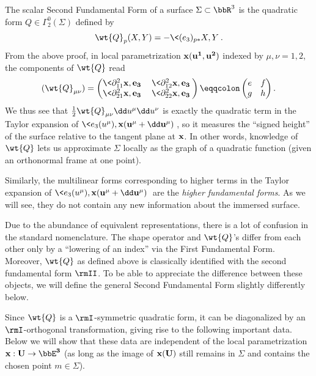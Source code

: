 \begin{defn}
    The scalar Second Fundamental Form of a surface $\Sigma\subset\bbR^3$ is the quadratic form $Q\in\Gamma^0_2(\Sigma)$ defined by 
    \[\wt{Q}_p(X,Y)=-\<(e_3)_{p\ast}X,Y\>.\]
    From the above proof, in local parametrization $\bf{x}(u^1,u^2)$ indexed by $\mu,\nu=1,2$, the components of $\wt{Q}$ read 
    \[(\wt{Q}_{\mu\nu})=
    \begin{pmatrix}
        \<\partial^2_{11}\bf{x},e_3\>& \<\partial^2_{12}\bf{x},e_3\>\\
        \<\partial^2_{21}\bf{x},e_3\> & \<\partial^2_{22}\bf{x},e_3\>
    \end{pmatrix}
    \eqqcolon\begin{pmatrix}
        e&f\\
        g&h
    \end{pmatrix}.\label{eq hopf differential components}
    \]
    We thus see that $\frac12\wt{Q}_{\mu\nu}\dd u^\mu \dd u^\nu$ is exactly the quadratic term in the Taylor expansion of $\<e_3(u^\mu),\bf{x}(u^\mu+\dd u^\mu)\>$, so it measures the ``signed height'' of the surface relative to the tangent plane at $\bf{x}$. In other words, knowledge of $\wt{Q}$ lets us approximate $\Sigma$ locally as the graph of a quadratic function (given an orthonormal frame at one point).
\end{defn}

Similarly, the multilinear forms corresponding to higher terms in the Taylor expansion of $\<e_3(u^\mu),\bf{x}(u^\mu+\dd u^\mu)\>$ are the \emph{higher fundamental forms}. As we will see, they do not contain any new information about the immersed surface.


\begin{rem}
    Due to the abundance of equivalent representations, there is a lot of confusion in the standard nomenclature. The shape operator and $\wt{Q}$'s differ from each other only by a ``lowering of an index'' via the First Fundamental Form. Moreover, $\wt{Q}$ as defined above is classically identified with the second fundamental form $\rmII$. To be able to appreciate the difference between these objects, we will define the general Second Fundamental Form slightly differently below.
\end{rem}

Since $\wt{Q}$ is a $\rmI$-symmetric quadratic form, it can be diagonalized by an $\rmI$-orthogonal transformation, giving rise to the following important data. Below we will show that these data are independent of the local parametrization $\bf{x}:U\to \bbE^3$ (as long as the image of $\bf{x}(U)$ still remains in $\Sigma$ and contains the chosen point $m\in\Sigma$).


